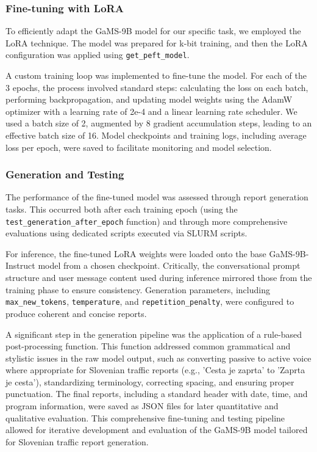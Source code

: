 \documentclass[fleqn,moreauthors,10pt]{ds_report}
\begin{document}
\subsubsection*{Fine-tuning with LoRA}
To efficiently adapt the GaMS-9B model for our specific task, we employed the LoRA technique. The model was prepared for k-bit training, and then the LoRA configuration was applied using \texttt{get\_peft\_model}.

A custom training loop was implemented to fine-tune the model. For each of the 3 epochs, the process involved standard steps: calculating the loss on each batch, performing backpropagation, and updating model weights using the AdamW optimizer with a learning rate of 2e-4 and a linear learning rate scheduler. We used a batch size of 2, augmented by 8 gradient accumulation steps, leading to an effective batch size of 16. Model checkpoints and training logs, including average loss per epoch, were saved to facilitate monitoring and model selection.

\subsubsection*{Generation and Testing}
The performance of the fine-tuned model was assessed through report generation tasks. This occurred both after each training epoch (using the \texttt{test\_generation\_after\_epoch} function) and through more comprehensive evaluations using dedicated scripts executed via SLURM scripts.

For inference, the fine-tuned LoRA weights were loaded onto the base GaMS-9B-Instruct model from a chosen checkpoint. Critically, the conversational prompt structure and user message content used during inference mirrored those from the training phase to ensure consistency. Generation parameters, including \texttt{max\_new\_tokens}, \texttt{temperature}, and \texttt{repetition\_penalty}, were configured to produce coherent and concise reports.

A significant step in the generation pipeline was the application of a rule-based post-processing function. This function addressed common grammatical and stylistic issues in the raw model output, such as converting passive to active voice where appropriate for Slovenian traffic reports (e.g., 'Cesta je zaprta' to 'Zaprta je cesta'), standardizing terminology, correcting spacing, and ensuring proper punctuation. The final reports, including a standard header with date, time, and program information, were saved as JSON files for later quantitative and qualitative evaluation.
This comprehensive fine-tuning and testing pipeline allowed for iterative development and evaluation of the GaMS-9B model tailored for Slovenian traffic report generation.
\end{document}
